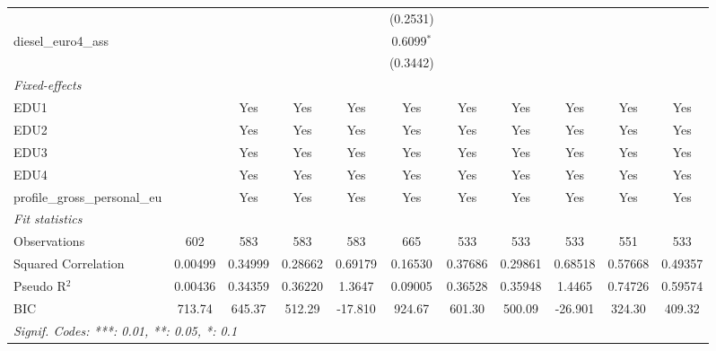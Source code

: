 \begin{tabular}{lcccccccccc}
                                             &          &          &          &          & (0.2531)     &          &          &          &              &   \\   
   diesel\_euro4\_ass                        &          &          &          &          & 0.6099$^{*}$ &          &          &          &              &   \\   
                                             &          &          &          &          & (0.3442)     &          &          &          &              &   \\   
   \midrule
   \emph{Fixed-effects}\\
   EDU1                                      &          & Yes      & Yes      & Yes      & Yes          & Yes      & Yes      & Yes      & Yes          & Yes\\  
   EDU2                                      &          & Yes      & Yes      & Yes      & Yes          & Yes      & Yes      & Yes      & Yes          & Yes\\  
   EDU3                                      &          & Yes      & Yes      & Yes      & Yes          & Yes      & Yes      & Yes      & Yes          & Yes\\  
   EDU4                                      &          & Yes      & Yes      & Yes      & Yes          & Yes      & Yes      & Yes      & Yes          & Yes\\  
   profile\_gross\_personal\_eu              &          & Yes      & Yes      & Yes      & Yes          & Yes      & Yes      & Yes      & Yes          & Yes\\  
   \midrule
   \emph{Fit statistics}\\
   Observations                              & 602      & 583      & 583      & 583      & 665          & 533      & 533      & 533      & 551          & 533\\  
   Squared Correlation                       & 0.00499  & 0.34999  & 0.28662  & 0.69179  & 0.16530      & 0.37686  & 0.29861  & 0.68518  & 0.57668      & 0.49357\\  
   Pseudo R$^2$                              & 0.00436  & 0.34359  & 0.36220  & 1.3647   & 0.09005      & 0.36528  & 0.35948  & 1.4465   & 0.74726      & 0.59574\\  
   BIC                                       & 713.74   & 645.37   & 512.29   & -17.810  & 924.67       & 601.30   & 500.09   & -26.901  & 324.30       & 409.32\\  
   \midrule \midrule
   \multicolumn{11}{l}{\emph{Signif. Codes: ***: 0.01, **: 0.05, *: 0.1}}\\
\end{tabular}
\par\endgroup



